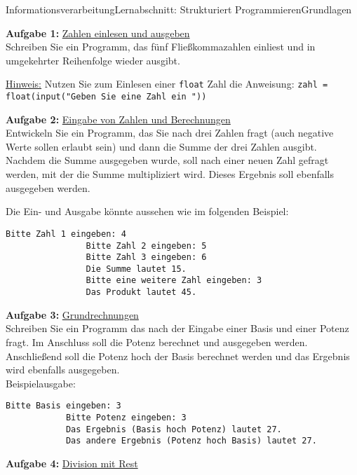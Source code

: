 \documentclass[oneside,openany,headings=optiontotoc,11pt,numbers=noenddot]{scrreprt}
\begin{document}
	\begin{worksheet}{Informationsverarbeitung}{Lernabschnitt: Strukturiert Programmieren}{Grundlagen}	
		\noindent
		\sffamily
		\begin{framed}
			\noindent
			\textbf{Aufgabe 1:} \underline{Zahlen einlesen und ausgeben}\\
			Schreiben Sie ein Programm, das fünf Fließkommazahlen einliest und in umgekehrter Reihenfolge wieder ausgibt.\\
			\par\noindent
			\underline{Hinweis:} Nutzen Sie zum Einlesen einer \lstinline[style=Python]|float| Zahl die Anweisung: \lstinline[style=Python]|zahl = float(input("Geben Sie eine Zahl ein "))|\\
			\par\noindent
			\textbf{Aufgabe 2:} \underline{Eingabe von Zahlen und Berechnungen}\\
			Entwickeln Sie ein Programm, das Sie nach drei Zahlen fragt (auch negative Werte sollen erlaubt sein) und dann die Summe der drei Zahlen ausgibt. Nachdem die Summe ausgegeben wurde, soll nach einer neuen Zahl gefragt werden, mit der die Summe multipliziert wird. Dieses Ergebnis soll ebenfalls ausgegeben werden.\\
			\par\noindent
			Die Ein- und Ausgabe könnte aussehen wie im folgenden Beispiel:
			\begin{lstlisting}[style=Python]
				Bitte Zahl 1 eingeben: 4
				Bitte Zahl 2 eingeben: 5
				Bitte Zahl 3 eingeben: 6
				Die Summe lautet 15.
				Bitte eine weitere Zahl eingeben: 3
				Das Produkt lautet 45.
			\end{lstlisting}
			\textbf{Aufgabe 3:} \underline{Grundrechnungen}\\
			Schreiben Sie ein Programm das nach der Eingabe einer Basis und einer Potenz fragt. Im Anschluss soll die Potenz berechnet und ausgegeben werden.\\
			Anschließend soll die Potenz hoch der Basis berechnet werden und das Ergebnis wird ebenfalls ausgegeben.\\
			Beispielausgabe:
			\begin{lstlisting}[style=Python]
			Bitte Basis eingeben: 3
			Bitte Potenz eingeben: 3
			Das Ergebnis (Basis hoch Potenz) lautet 27.
			Das andere Ergebnis (Potenz hoch Basis) lautet 27.
			\end{lstlisting}
			\par\noindent
			\textbf{Aufgabe 4:} \underline{Division mit Rest}\\

\end{framed}
\end{worksheet}
\end{document}
